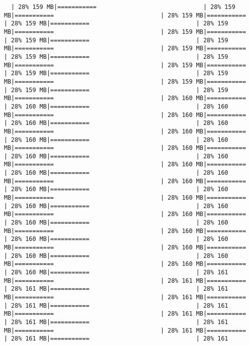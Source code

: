 \documentclass[
]{article}
\begin{document}
\begin{verbatim}
  | 28% 159 MB|===========                              | 28% 159 MB|===========                              | 28% 159 MB|===========                              | 28% 159 MB|===========                              | 28% 159 MB|===========                              | 28% 159 MB|===========                              | 28% 159 MB|===========                              | 28% 159 MB|===========                              | 28% 159 MB|===========                              | 28% 159 MB|===========                              | 28% 159 MB|===========                              | 28% 159 MB|===========                              | 28% 159 MB|===========                              | 28% 159 MB|===========                              | 28% 159 MB|===========                              | 28% 159 MB|===========                              | 28% 159 MB|===========                              | 28% 160 MB|===========                              | 28% 160 MB|===========                              | 28% 160 MB|===========                              | 28% 160 MB|===========                              | 28% 160 MB|===========                              | 28% 160 MB|===========                              | 28% 160 MB|===========                              | 28% 160 MB|===========                              | 28% 160 MB|===========                              | 28% 160 MB|===========                              | 28% 160 MB|===========                              | 28% 160 MB|===========                              | 28% 160 MB|===========                              | 28% 160 MB|===========                              | 28% 160 MB|===========                              | 28% 160 MB|===========                              | 28% 160 MB|===========                              | 28% 160 MB|===========                              | 28% 160 MB|===========                              | 28% 160 MB|===========                              | 28% 160 MB|===========                              | 28% 160 MB|===========                              | 28% 160 MB|===========                              | 28% 160 MB|===========                              | 28% 160 MB|===========                              | 28% 160 MB|===========                              | 28% 160 MB|===========                              | 28% 160 MB|===========                              | 28% 160 MB|===========                              | 28% 160 MB|===========                              | 28% 160 MB|===========                              | 28% 160 MB|===========                              | 28% 161 MB|===========                              | 28% 161 MB|===========                              | 28% 161 MB|===========                              | 28% 161 MB|===========                              | 28% 161 MB|===========                              | 28% 161 MB|===========                              | 28% 161 MB|===========                              | 28% 161 MB|===========                              | 28% 161 MB|===========                              | 28% 161 MB|===========                              | 28% 161 MB|===========                              | 28% 161 MB|===========                              | 28% 161 
\end{verbatim}
\end{document}
